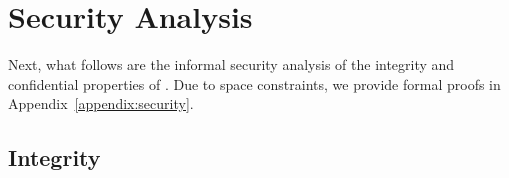 \section{Security Analysis}
\label{sec:securityAnalysis}




Next, what follows are the informal security analysis of the integrity and confidential properties of \name. Due to space constraints, we provide formal proofs in Appendix~\ref{appendix:security}.


\subsection{Integrity}
\label{sec:securityAnalysis:integrity}


